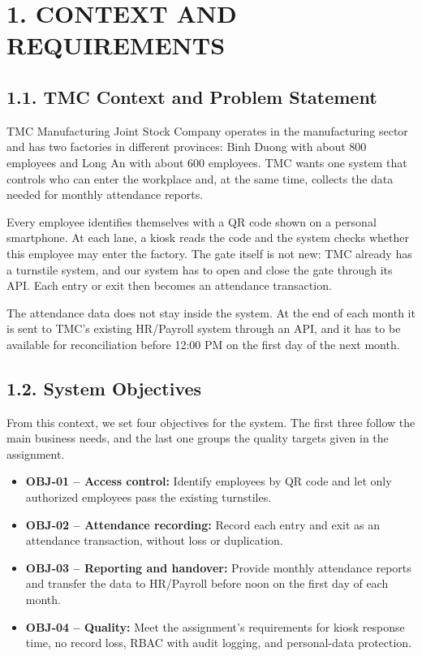 \section*{1. CONTEXT AND REQUIREMENTS}

{}

\subsection*{1.1. TMC Context and Problem Statement}

{}

TMC Manufacturing Joint Stock Company operates in the manufacturing sector and has two factories in different provinces: Binh Duong with about 800 employees and Long An with about 600 employees. TMC wants one system that controls who can enter the workplace and, at the same time, collects the data needed for monthly attendance reports.

Every employee identifies themselves with a QR code shown on a personal smartphone. At each lane, a kiosk reads the code and the system checks whether this employee may enter the factory. The gate itself is not new: TMC already has a turnstile system, and our system has to open and close the gate through its API. Each entry or exit then becomes an attendance transaction.

The attendance data does not stay inside the system. At the end of each month it is sent to TMC's existing HR/Payroll system through an API, and it has to be available for reconciliation before 12:00 PM on the first day of the next month.

\subsection*{1.2. System Objectives}

{}

From this context, we set four objectives for the system. The first three follow the main business needs, and the last one groups the quality targets given in the assignment.

\begin{itemize}[leftmargin=36pt, itemsep=2pt, topsep=4pt, parsep=2pt]
  \item \textbf{OBJ-01 -- Access control:} Identify employees by QR code and let only authorized employees pass the existing turnstiles.
  \item \textbf{OBJ-02 -- Attendance recording:} Record each entry and exit as an attendance transaction, without loss or duplication.
  \item \textbf{OBJ-03 -- Reporting and handover:} Provide monthly attendance reports and transfer the data to HR/Payroll before noon on the first day of each month.
  \item \textbf{OBJ-04 -- Quality:} Meet the assignment's requirements for kiosk response time, no record loss, RBAC with audit logging, and personal-data protection.
\end{itemize}

